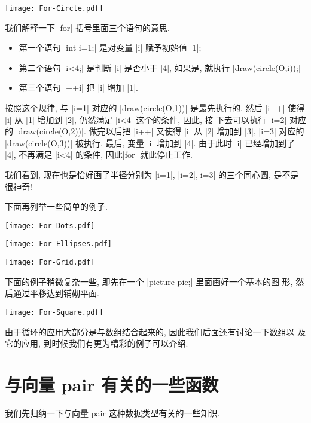 \documentclass{ctexbook}
\begin{document}
\begin{center}\texttt{[image: For-Circle.pdf]}\end{center}%


我们解释一下 |for| 括号里面三个语句的意思.
\begin{itemize}
\item 第一个语句 |int i=1;| 是对变量 |i| 赋予初始值
  |1|;
\item 第二个语句 |i<4;| 是判断 |i| 是否小于 |4|,
  如果是, 就执行 |draw(circle(O,i));|
\item 第三个语句  |++i| 把 |i| 增加 |1|.
\end{itemize}

按照这个规律,  与 |i=1| 对应的 |draw(circle(O,1))| 是最先执行的. 然后
|i++| 使得 |i| 从 |1| 增加到 |2|, 仍然满足 |i<4| 这个的条件, 因此, 接
下去可以执行 |i=2| 对应的 |draw(circle(O,2))|. 做完以后把 |i++| 又使得
|i| 从 |2| 增加到 |3|, |i=3| 对应的 |draw(circle(O,3))| 被执行. 最后,
变量 |i| 增加到 |4|. 由于此时 |i| 已经增加到了 |4|, 不再满足 |i<4|
的条件, 因此|for| 就此停止工作. 

我们看到, 现在也是恰好画了半径分别为 |i=1|, |i=2|,|i=3| 的三个同心圆,
是不是很神奇!  

下面再列举一些简单的例子.
\begin{center}\texttt{[image: For-Dots.pdf]}\end{center}%


\begin{center}\texttt{[image: For-Ellipses.pdf]}\end{center}%


\begin{center}\texttt{[image: For-Grid.pdf]}\end{center}%


下面的例子稍微复杂一些, 即先在一个 |picture pic;| 里面画好一个基本的图
形, 然后通过平移达到铺砌平面.
\begin{center}\texttt{[image: For-Square.pdf]}\end{center}%


由于循环的应用大部分是与数组结合起来的, 因此我们后面还有讨论一下数组以
及它的应用, 到时候我们有更为精彩的例子可以介绍.

\section{与向量 pair  有关的一些函数}
我们先归纳一下与向量 pair 这种数据类型有关的一些知识.
\end{document}
